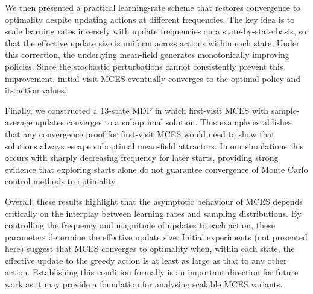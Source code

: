 \documentclass{article}
\begin{document}
We then presented a practical learning-rate scheme that restores convergence to optimality despite updating actions at different frequencies. 
The key idea is to scale learning rates inversely with update frequencies on a state-by-state basis, so that the effective update size is uniform across actions within each state. Under this correction, the underlying mean-field generates monotonically improving policies. 
Since the stochastic perturbations cannot consistently prevent this improvement, initial-visit MCES eventually converges to the optimal policy and its action values.


Finally, we constructed a 13-state MDP in which first-visit MCES with sample-average updates converges to a suboptimal solution.
This example establishes that any convergence proof for first-visit MCES would need to show that solutions always escape suboptimal mean-field attractors.
In our simulations this occurs with sharply decreasing frequency for later starts, providing strong evidence that exploring starts alone do not guarantee convergence of Monte Carlo control methods to optimality.


Overall, these results highlight that
the asymptotic behaviour of MCES depends critically on the interplay between learning rates and sampling distributions.
By controlling the frequency and magnitude of updates to each action, these parameters determine the effective update size.
Initial experiments (not presented here) suggest that MCES converges to optimality when, within each state, the effective update to the greedy action is at least as large as that to any other action.
Establishing this condition formally is an important direction for future work
as it may provide a foundation for analysing scalable MCES variants.



\clearpage
% 
 


\appendix




% 
\end{document}
